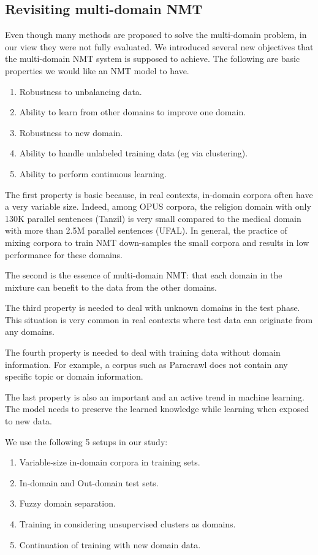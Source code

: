 \documentclass[12pt,a4paper,twoside]{report}
\theoremstyle{definition}
\begin{document}
\subsection*{Revisiting multi-domain NMT}
Even though many methods are proposed to solve the multi-domain problem, in our view they were not fully evaluated. We introduced several new objectives that the multi-domain NMT system is supposed to achieve. The following are basic properties we would like an NMT model to have.
\begin{enumerate}
	\item \label{ax:1} Robustness to unbalancing data.
	\item \label{ax:2} Ability to learn from other domains to improve one domain.
	\item \label{ax:3} Robustness to new domain.
	\item \label{ax:4} Ability to handle unlabeled training data (eg via clustering).
	\item \label{ax:5} Ability to perform continuous learning.
\end{enumerate}

The first property is basic because, in real contexts, in-domain corpora often have a very variable size. Indeed, among OPUS corpora, the religion domain with only 130K parallel sentences (Tanzil) is very small compared to the medical domain with more than 2.5M parallel sentences (UFAL). In general, the practice of mixing corpora to train NMT down-samples the small corpora and results in low performance for these domains. 

The second is the essence of multi-domain NMT: that each domain in the mixture can benefit to the data from the other domains. 

The third property is needed to deal with unknown domains in the test phase. This situation is very common in real contexts where test data can originate from any domains. 

The fourth property is needed to deal with training data without domain information. For example, a corpus such as Paracrawl does not contain any specific topic or domain information. 

The last property is also an important and an active trend in machine learning. The model needs to preserve the learned knowledge while learning when exposed to new data.

We use the following 5 setups in our study:
\begin{enumerate}
	\item \label{setup:1} Variable-size in-domain corpora in training sets.
	\item \label{setup:2} In-domain and Out-domain test sets.
	\item \label{setup:3} Fuzzy domain separation.
	\item \label{setup:4} Training in considering unsupervised clusters as domains.
	\item \label{setup:5} Continuation of training with new domain data.
\end{enumerate}
\end{document}
